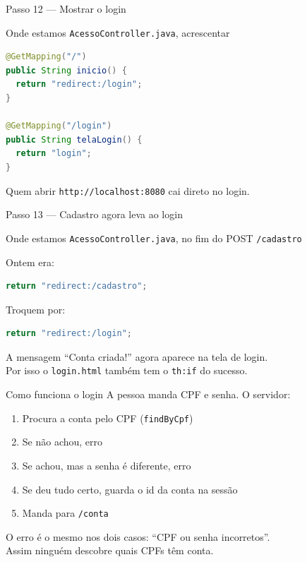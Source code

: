 \documentclass[aspectratio=169,11pt]{beamer}
\newcommand{\onde}[1]{%
  \begin{block}{Onde estamos}
    #1
  \end{block}
}
\begin{document}
\begin{frame}[fragile]{Passo 12 --- Mostrar o login}
  \onde{\texttt{AcessoController.java}, acrescentar}

\begin{lstlisting}[language=Java,basicstyle=\ttfamily\footnotesize]
@GetMapping("/")
public String inicio() {
  return "redirect:/login";
}

@GetMapping("/login")
public String telaLogin() {
  return "login";
}
\end{lstlisting}

  \vspace{0.3em}
  Quem abrir \texttt{http://localhost:8080} cai direto no login.
\end{frame}

\begin{frame}[fragile]{Passo 13 --- Cadastro agora leva ao login}
  \onde{\texttt{AcessoController.java}, no fim do POST \texttt{/cadastro}}

  Ontem era:

\begin{lstlisting}[language=Java,basicstyle=\ttfamily\footnotesize]
  return "redirect:/cadastro";
\end{lstlisting}

  Troquem por:

\begin{lstlisting}[language=Java,basicstyle=\ttfamily\footnotesize]
  return "redirect:/login";
\end{lstlisting}

  \vspace{0.3em}
  A mensagem ``Conta criada!'' agora aparece na tela de login.\\
  Por isso o \texttt{login.html} também tem o \texttt{th:if} do sucesso.
\end{frame}

\begin{frame}{Como funciona o login}
  A pessoa manda CPF e senha. O servidor:

  \vspace{0.5em}
  \begin{enumerate}
    \item Procura a conta pelo CPF (\texttt{findByCpf})
    \item Se não achou, erro
    \item Se achou, mas a senha é diferente, erro
    \item Se deu tudo certo, guarda o id da conta na sessão
    \item Manda para \texttt{/conta}
  \end{enumerate}

  \vspace{0.5em}
  O erro é o mesmo nos dois casos: ``CPF ou senha incorretos''.\\
  Assim ninguém descobre quais CPFs têm conta.
\end{frame}
\end{document}
